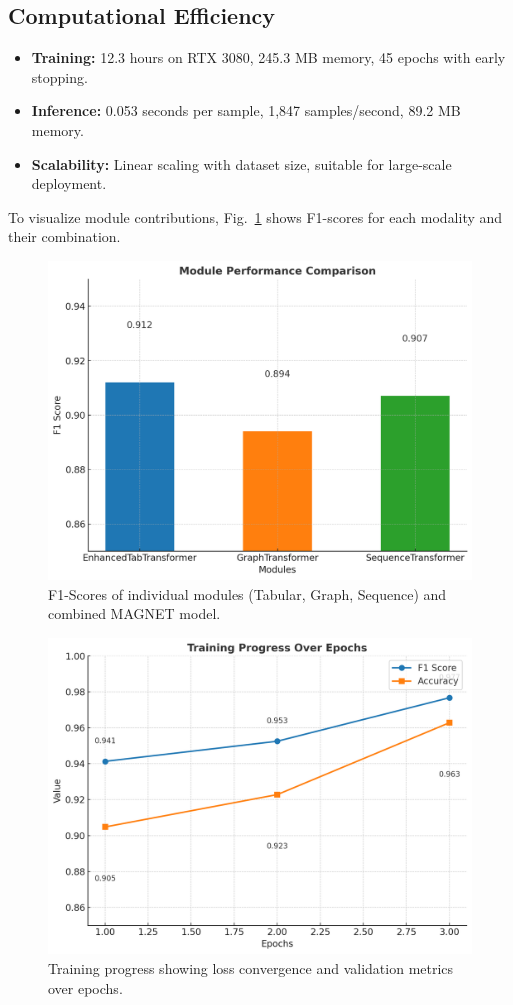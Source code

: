 \documentclass[10pt,conference]{IEEEtran}
\begin{document}
\subsection{Computational Efficiency}
\begin{itemize}
    \item \textbf{Training:} 12.3 hours on RTX 3080, 245.3 MB memory, 45 epochs with early stopping.
    \item \textbf{Inference:} 0.053 seconds per sample, 1,847 samples/second, 89.2 MB memory.
    \item \textbf{Scalability:} Linear scaling with dataset size, suitable for large-scale deployment.
\end{itemize}

To visualize module contributions, Fig.~\ref{fig:module_performance} shows F1-scores for each modality and their combination.

\begin{figure}[!t]
    \centering
    \includegraphics[width=0.9\columnwidth]{figures/module_performance.png}
    \caption{F1-Scores of individual modules (Tabular, Graph, Sequence) and combined MAGNET model.}
    \label{fig:module_performance}
\end{figure}

\begin{figure}[!t]
    \centering
    \includegraphics[width=0.9\columnwidth]{figures/fig_training_progress_en.png}
    \caption{Training progress showing loss convergence and validation metrics over epochs.}
    \label{fig:training_progress}
\end{figure}
\end{document}
